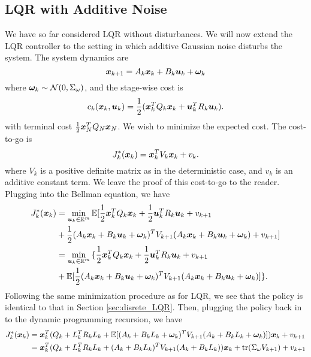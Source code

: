 \subsection{LQR with Additive Noise}

We have so far considered LQR without disturbances. We will now extend the LQR controller to the setting in which additive Gaussian noise disturbs the system.
The system dynamics are
\begin{equation}
    \bm{x}_{k+1} = A_k \bm{x}_k + B_k \bm{u}_k + \bm{\omega}_{k}
\end{equation}
where $\bm{\omega}_{k} \sim \mathcal{N}(0, \Sigma_{\omega})$, and the stage-wise cost is 
\begin{equation}
    c_k(\bm{x}_k,\bm{u}_k) = \frac{1}{2} ( \bm{x}_k^T Q_k \bm{x}_k + \bm{u}_k^T R_k \bm{u}_k).
\end{equation}
with terminal cost $\frac{1}{2}\bm{x}_N^T Q_N \bm{x}_N$. We wish to minimize the expected cost. The cost-to-go is
\begin{equation}
     J_{k}^*(\bm{x}_{k}) = \bm{x}^T_k V_k \bm{x}_k + v_k.
\end{equation}
where $V_k$ is a positive definite matrix as in the deterministic case, and $v_k$ is an additive constant term. We leave the proof of this cost-to-go to the reader. Plugging into the Bellman equation, we have 
\begin{align}
\label{eq:LQR_rec_cost_stoch}
    J_{k}^*(\bm{x}_{k}) &=  \min_{\bm{u}_{k} \in \mathbb{R}^m} \mathbb{E} {\Large[} 
    \frac{1}{2} \bm{x}_{k}^T Q_{k} \bm{x}_{k} + \frac{1}{2} \bm{u}_{k}^T R_{k} \bm{u}_{k} + v_{k+1}\\
    &+ \frac{1}{2} (A_{k} \bm{x}_{k} + B_{k} \bm{u}_{k} + \bm{\omega}_{k})^T V_{k+1} (A_{k} \bm{x}_{k} + B_{k} \bm{u}_{k} + \bm{\omega}_{k}) + v_{k+1} \nonumber {\Large]} \nonumber\\
    &= \min_{\bm{u}_{k} \in \mathbb{R}^m} {\Large\{} 
    \frac{1}{2} \bm{x}_{k}^T Q_{k} \bm{x}_{k} + \frac{1}{2} \bm{u}_{k}^T R_{k} \bm{u}_{k}  + v_{k+1}\\
    &+ \mathbb{E} {\Large[} \frac{1}{2} (A_{k} \bm{x}_{k} + B_{k} \bm{u}_{k} + \bm{\omega}_{k})^T V_{k+1} (A_{k} \bm{x}_{k} + B_{k} \bm{u}_{k} + \bm{\omega}_{k})\nonumber {\Large]} {\Large\}}. \nonumber
\end{align}
Following the same minimization procedure as for LQR, we see that the policy is identical to that in Section \ref{sec:disrete_LQR}. Then, plugging the policy back in to the dynamic programming recursion, we have
\begin{align}
    J_{k}^*(\bm{x}_{k}) &= \bm{x}_k^T(Q_k + L_k^T R_k L_k + \mathbb{E}[(A_{k}+ B_{k} L_k + \bm{\omega}_{k})^T V_{k+1} (A_{k} + B_{k} L_k + \bm{\omega}_{k})])\bm{x}_k  + v_{k+1}\label{eq:ric_lqr_stoch1}\\
    &= \bm{x}_k^T(Q_{k}  + L_{k}^T R_{k} L_{k} + (A_{k} + B_{k} L_{k})^T V_{k+1}   (A_{k} + B_{k} L_{k}))\bm{x}_k  + \text{tr}(\Sigma_{\omega} V_{k+1}) + v_{k+1}\label{eq:ric_lqr_stoch2}
\end{align}
